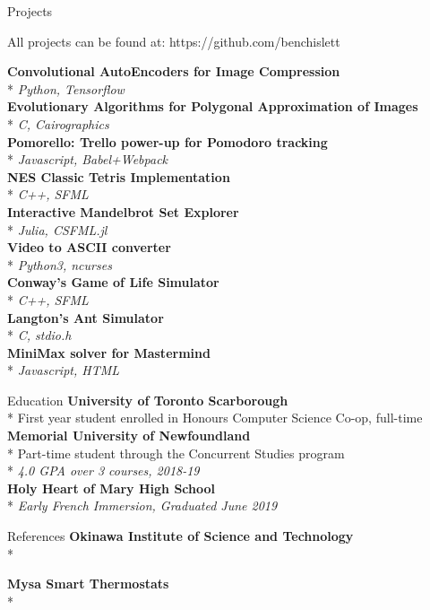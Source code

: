 \documentclass[11pt, letterpaper]{article}
\begin{document}
\begin{section}{Projects}

All projects can be found at:
https://github.com/benchislett

\begin{multicols}{2}
\textbf{Convolutional AutoEncoders for Image Compression}\\*
\textit{Python, Tensorflow}\\

\textbf{Evolutionary Algorithms for Polygonal Approximation of Images}\\*
\textit{C, Cairographics}\\

\textbf{Pomorello: Trello power-up for Pomodoro tracking}\\*
\textit{Javascript, Babel+Webpack}\\

\textbf{NES Classic Tetris Implementation}\\*
\textit{C++, SFML}\\

\textbf{Interactive Mandelbrot Set Explorer}\\*
\textit{Julia, CSFML.jl}\\

\textbf{Video to ASCII converter}\\*
\textit{Python3, ncurses}\\

\textbf{Conway's Game of Life Simulator}\\*
\textit{C++, SFML}\\

\textbf{Langton's Ant Simulator}\\*
\textit{C, stdio.h}\\

\textbf{MiniMax solver for Mastermind}\\*
\textit{Javascript, HTML}
\end{multicols}

\end{section}

\begin{section}{Education}
\textbf{University of Toronto Scarborough}\\*
First year student enrolled in Honours Computer Science Co-op, full-time\\

\textbf{Memorial University of Newfoundland}\\*
Part-time student through the Concurrent Studies program\\*
\textit{4.0 GPA over 3 courses, 2018-19}\\

\textbf{Holy Heart of Mary High School}\\*
\textit{Early French Immersion, Graduated June 2019}
\end{section}

\begin{section}{References}
\textbf{Okinawa Institute of Science and Technology}\\*

\textbf{Mysa Smart Thermostats}\\*


\end{section}
\end{document}
